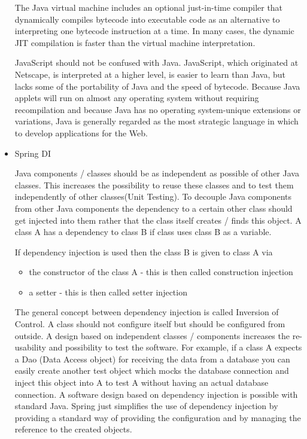 \documentclass[12pt,a4paper,titlepage]{article}
\begin{document}
\begin{itemize}
	The Java virtual machine includes an optional just-in-time compiler that dynamically compiles bytecode into executable code as an alternative to interpreting one bytecode instruction at a time. In many cases, the dynamic JIT compilation is faster than the virtual machine interpretation.

	JavaScript should not be confused with Java. JavaScript, which originated at Netscape, is interpreted at a higher level, is easier to learn than Java, but lacks some of the portability of Java and the speed of bytecode. Because Java applets will run on almost any operating system without requiring recompilation and because Java has no operating system-unique extensions or variations, Java is generally regarded as the most strategic language in which to develop applications for the Web.


\item Spring DI

Java components / classes should be as independent as possible of other Java classes. This increases the possibility to reuse these classes and to test them independently of other classes(Unit Testing). To decouple Java components from other Java components the dependency to a certain other class should get injected into them rather that the class itself creates / finds this object. A class A has a dependency to class B if class uses class B as a variable.


If dependency injection is used then the class B is given to class A via
\begin{itemize}
\item the constructor of the class A - this is then called construction injection
\item a setter - this is then called setter injection
\end{itemize}

The general concept between dependency injection is called Inversion of Control. A class should not configure itself but should be configured from outside. A design based on independent classes / components increases the re-usability and possibility to test the software. For example, if a class A expects a Dao (Data Access object) for receiving the data from a database you can easily create another test object which mocks the database connection and inject this object into A to test A without having an actual database connection. A software design based on dependency injection is possible with standard Java. Spring just simplifies the use of dependency injection by providing a standard way of providing the configuration and by managing the reference to the created objects.


\end{itemize}
\end{document}
